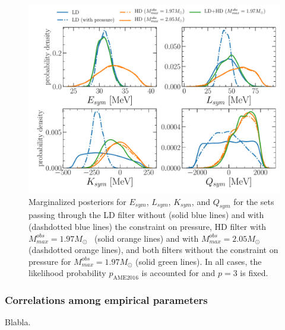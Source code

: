 \begin{figure}[!t]
\begin{center}
  \includegraphics[width=1.0\linewidth]{figures/iv_dist.pdf}
\end{center}
\caption[Marginalized posteriors for isovector empirical parameters assuming
different filters]{Marginalized posteriors for $E_{sym}$, $L_{sym}$, $K_{sym}$, 
and $Q_{sym}$ for the sets passing through the LD filter without (solid blue
lines) and with (dashdotted blue lines) the constraint on pressure, HD
filter with $M_{max}^{obs}=1.97M_\odot$~\cite{Antoniadis2013} (solid orange
lines) and with $M_{max}^{obs}=2.05M_\odot$~\cite{Cromartie2020}
(dashdotted orange lines), and both filters without the constraint on 
pressure for $M_{max}^{obs}=1.97M_\odot$ (solid green lines). In all cases, 
the likelihood probability $p_{\text{AME2016}}$ is accounted for and $p=3$ is 
fixed.}\label{fig:iv_dist}
\end{figure}
 
\subsubsection{Correlations among empirical parameters}\label{subsubsec:corr}

Blabla.

